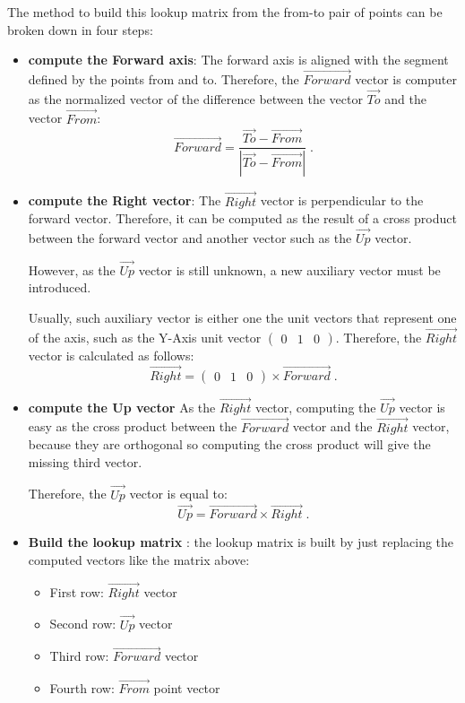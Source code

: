 \documentclass[12pt,a4paper]{extarticle}
\begin{document}
The method to build this lookup matrix from the from-to pair of points can be broken down in four steps:
\begin{itemize}
\item \textbf{compute the Forward axis}: The forward axis is aligned with the segment defined by the points from and to. Therefore, the $\vec{Forward}$ vector is computer as the normalized vector of the difference between the vector $\vec{To}$ and the vector $\vec{From}$: 
\[
\vec{Forward} = \frac{\vec{To} - \vec{From}}{|\vec{To}-\vec{From}|} \;.
\] 

\item \textbf{compute the Right vector}: The $\vec{Right}$ vector is perpendicular to the forward vector. Therefore, it can be computed as the result of a cross product between the forward vector and another vector such as the $\vec{Up}$ vector. 

However, as the $\vec{Up}$ vector is still unknown, a new auxiliary vector must be introduced. 

Usually, such auxiliary vector is either one the unit vectors that represent one of the axis, such as the Y-Axis unit vector $\begin{pmatrix}
0 & 1 &0
\end{pmatrix}$. Therefore, the $\vec{Right}$ vector is calculated as follows:
\[
\vec{Right} = \begin{pmatrix}
0 & 1 & 0
\end{pmatrix}
\times \vec{Forward}
\;.
\]
\item \textbf{compute the Up vector} As the $\vec{Right}$ vector, computing the $\vec{Up}$ vector is easy as the cross product between the $\vec{Forward}$ vector and the $\vec{Right}$ vector, because they are orthogonal so computing the cross product will give the missing third vector.

Therefore, the $\vec{Up}$ vector is equal to:
\[
\vec{Up} = \vec{Forward} \times \vec{Right} \;.
\]
\item \textbf{Build the lookup matrix} : the lookup matrix is built by just replacing the computed vectors like the matrix above:
\begin{itemize}
\item First row: $\vec{Right}$ vector
\item Second row: $\vec{Up}$ vector
\item Third row: $\vec{Forward}$ vector
\item Fourth row: $\vec{From}$ point vector
\end{itemize}
\end{itemize}
\end{document}
